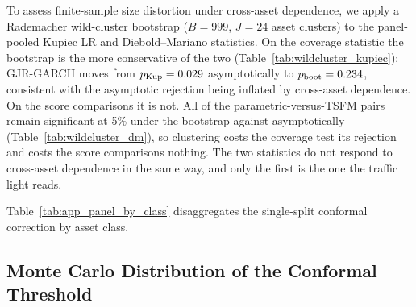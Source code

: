 \documentclass[preprint,11pt,authoryear]{elsarticle}
\newcommand{\1}{\boldsymbol{1}}
\begin{document}
To assess finite-sample size distortion under cross-asset dependence,
we apply a Rademacher wild-cluster bootstrap ($B = 999$, $J = 24$
asset clusters) to the panel-pooled Kupiec LR and Diebold--Mariano
statistics. On the coverage statistic the bootstrap is the more conservative of
the two (Table~\ref{tab:wildcluster_kupiec}): GJR-GARCH moves from
$p_{\text{Kup}} = 0.029$ asymptotically to
$p_{\text{boot}} = 0.234$, consistent with the asymptotic rejection
being inflated by cross-asset dependence. On the score comparisons it is not.
All \nWCDMSigBoot{} of the \nWCDMPairs{} parametric-versus-TSFM pairs remain
significant at 5\% under the bootstrap against \nWCDMSigAsymp{} asymptotically
(Table~\ref{tab:wildcluster_dm}), so clustering costs the coverage test its
rejection and costs the score comparisons nothing. The two statistics do not
respond to cross-asset dependence in the same way, and only the first is the one
the traffic light reads.

\begin{table}[H]
	\centering
	\caption{Wild-cluster bootstrap of panel-pooled Kupiec LR statistic
		($B=999$, Rademacher weights, $J=24$ asset clusters).}
	\label{tab:wildcluster_kupiec}
	\footnotesize
	
\end{table}

\begin{table}[H]
	\centering
	\caption{Wild-cluster bootstrap Diebold--Mariano $p$-values
		(parametric benchmark vs.\ TSFM). Bold: $p<0.01$; italic: $p<0.05$.}
	\label{tab:wildcluster_dm}
	\footnotesize
	
\end{table}

Table~\ref{tab:app_panel_by_class} disaggregates the single-split conformal
correction by asset class.

\begin{table}[H]
	\centering
	\caption{Single-split conformal correction by asset class ($\alpha=0.01$).
		Corrected $\hat\pi$ is the equal-weighted mean across all
		(model, asset) pairs within each class.}
	\label{tab:app_panel_by_class}
	\footnotesize
	
\end{table}

\subsection{Monte Carlo Distribution of the Conformal Threshold}
\label{app:mc_qv_distribution}
\end{document}

